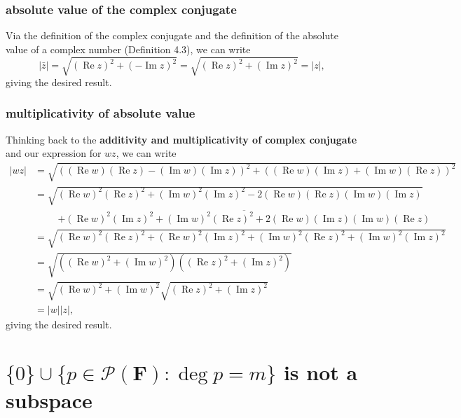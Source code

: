 \documentclass{article}
\begin{document}
\subsubsection*{absolute value of the complex conjugate}
Via the definition of the complex conjugate and the definition of the absolute value of a complex number (Definition 4.3), we can write
\[|\bar{z}|=\sqrt{(\operatorname{Re}z)^2+(-\operatorname{Im}z)^2}=\sqrt{(\operatorname{Re}z)^2+(\operatorname{Im}z)^2}=|z|,\]
giving the desired result.

\subsubsection*{multiplicativity of absolute value}
Thinking back to the \textbf{additivity and multiplicativity of complex conjugate} and our expression for $wz$, we can write
\begin{align*}
    |wz|&=\sqrt{((\operatorname{Re}w)(\operatorname{Re}z)-(\operatorname{Im}w)(\operatorname{Im}z))^2+((\operatorname{Re}w)(\operatorname{Im}z)+(\operatorname{Im}w)(\operatorname{Re}z))^2}\\
    &=\sqrt{(\operatorname{Re}w)^2(\operatorname{Re}z)^2+(\operatorname{Im}w)^2(\operatorname{Im}z)^2-2(\operatorname{Re}w)(\operatorname{Re}z)(\operatorname{Im}w)(\operatorname{Im}z)}\\
    &\;\;\;\;\;\;\;\;\,\overline{+(\operatorname{Re}w)^2(\operatorname{Im}z)^2+(\operatorname{Im}w)^2(\operatorname{Re}z)^2+2(\operatorname{Re}w)(\operatorname{Im}z)(\operatorname{Im}w)(\operatorname{Re}z)}\\
    &=\sqrt{(\operatorname{Re}w)^2(\operatorname{Re}z)^2+(\operatorname{Re}w)^2(\operatorname{Im}z)^2+(\operatorname{Im}w)^2(\operatorname{Re}z)^2+(\operatorname{Im}w)^2(\operatorname{Im}z)^2}\\
    &=\sqrt{((\operatorname{Re}w)^2+(\operatorname{Im}w)^2)((\operatorname{Re}z)^2+(\operatorname{Im}z)^2)}\\
    &=\sqrt{(\operatorname{Re}w)^2+(\operatorname{Im}w)^2}\sqrt{(\operatorname{Re}z)^2+(\operatorname{Im}z)^2}\\
    &=|w||z|,
\end{align*}
giving the desired result.

\clearpage

\section{$\{0\}\cup\{p\in\mathcal{P}(\mathbf{F}):\deg p=m\}$ is not a subspace}
\end{document}
